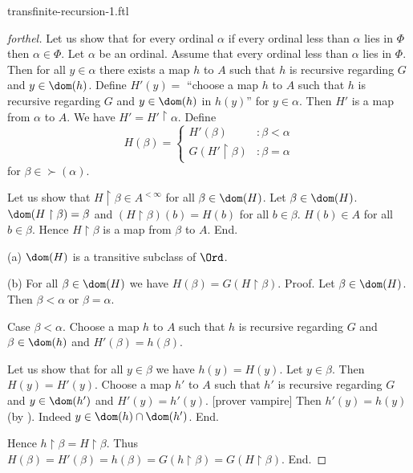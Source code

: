 \documentclass{naproche-library}
\begin{document}
\begin{smodule}{transfinite-recursion-1.ftl}
\begin{proof}[forthel]
      Let us show that for every ordinal $\alpha$ if every ordinal less than $\alpha$ lies in $\Phi$ then $\alpha \in \Phi$.
        Let $\alpha$ be an ordinal.
        Assume that every ordinal less than $\alpha$ lies in $\Phi$.
        Then for all $y \in \alpha$ there exists a map $h$ to $A$ such that $h$ is recursive regarding $G$ and $y \in \dom(h)$.
        Define $H'(y) =$ ``choose a map $h$ to $A$ such that $h$ is recursive regarding $G$ and $y \in \dom(h)$ in $h(y)$'' for $y \in \alpha$.
        Then $H'$ is a map from $\alpha$ to $A$.
        We have $H' = H' \restriction \alpha$.
        Define \[ H(\beta) =
          \begin{cases}
            H'(\beta)                 & : \beta < \alpha \\
            G(H' \restriction \beta)  & : \beta = \alpha
          \end{cases} \]
        for $\beta \in \succ(\alpha)$.
        
        Let us show that $H \restriction \beta \in A^{< \infty}$ for all $\beta \in \dom(H)$.
          Let $\beta \in \dom(H)$.
          $\dom(H \restriction \beta) = \beta$ and $(H \restriction \beta)(b) = H(b)$ for all $b \in \beta$.
          $H(b) \in A$ for all $b \in \beta$.
          Hence $H \restriction \beta$ is a map from $\beta$ to $A$.
        End.

        (a) $\dom(H)$ is a transitive subclass of $\Ord$.

        (b) For all $\beta \in \dom(H)$ we have $H(\beta) = G(H \restriction \beta)$. \newline
        Proof.
          Let $\beta \in \dom(H)$.
          Then $\beta < \alpha$ or $\beta = \alpha$.

          Case $\beta < \alpha$.
            Choose a map $h$ to $A$ such that $h$ is recursive regarding $G$ and $\beta \in \dom(h)$ and $H'(\beta) = h(\beta)$.

            Let us show that for all $y \in \beta$ we have $h(y) = H(y)$.
              Let $y \in \beta$.
              Then $H(y) = H'(y)$.
              Choose a map $h'$ to $A$ such that $h'$ is recursive regarding $G$ and $y \in \dom(h')$ and $H'(y) = h'(y)$.
              [prover vampire]
              Then $h'(y) = h(y)$ (by ).
              Indeed $y \in \dom(h) \cap \dom(h')$.
            End.

            Hence $h \restriction \beta = H \restriction \beta$.
            Thus $H(\beta)
              = H'(\beta)
              = h(\beta)
              = G(h \restriction \beta)
              = G(H \restriction \beta)$.
          End.


\end{proof}
\end{smodule}
\end{document}
